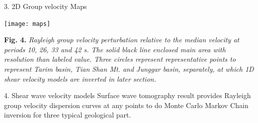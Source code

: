 \documentclass[
    landscape,      %
    paperwidth = 1200mm,
    paperheight = 900mm,
    fontscale = 0.4,
    margin = 1.7cm,
]{baposter}
\begin{document}
\begin{poster}
\begin{posterbox}[column=1]{3. 2D Group velocity Maps}
\begin{center}
\texttt{[image: maps]}
\begin{minipage}{0.9\textwidth}
\footnotesize
\vspace{0.2em}
\textbf{Fig. 4.}
\itshape
Rayleigh group velocity perturbation relative to the median velocity at periods
10, 26, 33 and 42 s. The solid black line enclosed main area with resolution than
labeled value. Three circles represent representative points to represent Tarim basin, Tian Shan Mt.
and Junggar basin, separately, at which 1D shear velocity models are inverted in later section.
\end{minipage}
\end{center}

\end{posterbox}

\begin{posterbox}[column=2 ]{4. Shear wave velocity models}
Surface wave tomography result provides Rayleigh group velocity dispersion curves
at any points to do Monte Carlo Markov Chain inversion for three typical geological
part.



\end{posterbox}
\end{poster}
\end{document}
